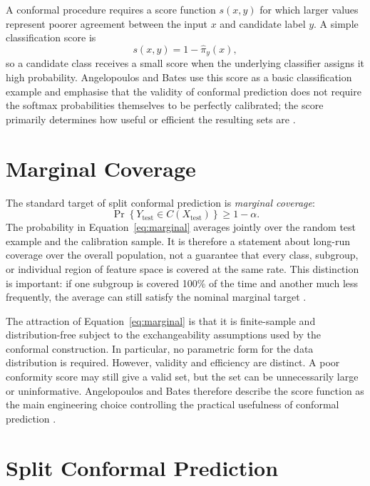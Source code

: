 \documentclass[12pt,a4paper]{article}
\begin{document}
A conformal procedure requires a score function $s(x,y)$ for which larger values represent poorer agreement between the input $x$ and candidate label $y$. A simple classification score is
\begin{equation}
    s(x,y)=1-\hat{\pi}_{y}(x),
    \label{eq:lac-score}
\end{equation}
so a candidate class receives a small score when the underlying classifier assigns it high probability. Angelopoulos and Bates use this score as a basic classification example and emphasise that the validity of conformal prediction does not require the softmax probabilities themselves to be perfectly calibrated; the score primarily determines how useful or efficient the resulting sets are \cite{angelopoulos2023gentle}.

\section{Marginal Coverage}

The standard target of split conformal prediction is \emph{marginal coverage}:
\begin{equation}
    \Pr\!\left\{Y_{\mathrm{test}}\in C(X_{\mathrm{test}})\right\}
    \geq 1-\alpha.
    \label{eq:marginal}
\end{equation}
The probability in Equation~\eqref{eq:marginal} averages jointly over the random test example and the calibration sample. It is therefore a statement about long-run coverage over the overall population, not a guarantee that every class, subgroup, or individual region of feature space is covered at the same rate. This distinction is important: if one subgroup is covered 100\% of the time and another much less frequently, the average can still satisfy the nominal marginal target \cite{angelopoulos2023gentle}.

The attraction of Equation~\eqref{eq:marginal} is that it is finite-sample and distribution-free subject to the exchangeability assumptions used by the conformal construction. In particular, no parametric form for the data distribution is required. However, validity and efficiency are distinct. A poor conformity score may still give a valid set, but the set can be unnecessarily large or uninformative. Angelopoulos and Bates therefore describe the score function as the main engineering choice controlling the practical usefulness of conformal prediction \cite{angelopoulos2023gentle}.

\section{Split Conformal Prediction}
\end{document}
